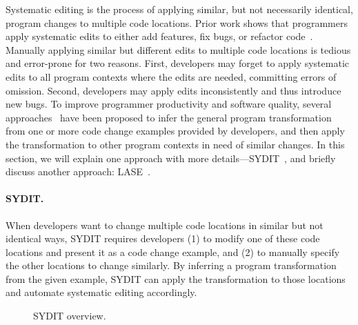 \documentclass[runningheads,a4paper]{llncs}
\begin{document}
Systematic editing is the process of applying similar, but not necessarily identical, program changes to multiple code locations. Prior work shows that programmers apply systematic edits to either add features, fix bugs, or refactor code~\cite{Kim:2005,Kim:2009,Nguyen:2010}. Manually applying similar but different edits to multiple code locations is tedious and error-prone for two reasons. First, developers may forget to apply systematic edits to all program contexts where the edits are needed, committing errors of omission. Second, developers may apply edits inconsistently and thus introduce new bugs. To improve programmer productivity and software quality, several approaches~\cite{MKM2011,MKM2013,Rolim:2017} have been proposed to infer the general program transformation from one or more code change examples provided by developers, and then apply the transformation to other program contexts in need of similar changes. In this section, we will explain one approach with more details---SYDIT~\cite{MKM2011}, and briefly discuss another approach: LASE~\cite{MKM2013}.

\paragraph{SYDIT.} When developers want to change multiple code locations in similar but not identical ways, SYDIT requires developers (1) to modify one of these code locations and present it as a code change example, and (2) to manually specify the other locations to change similarly. By inferring a program transformation from the given example, SYDIT can apply the transformation to those locations and automate systematic editing accordingly.

\begin{figure}
\centering
{}
\caption{SYDIT overview.}
\label{fig:syditoverview}
\end{figure}
\end{document}

